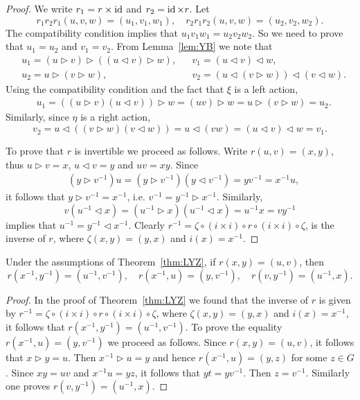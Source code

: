 \begin{proof}
We write $r_1=r\times\operatorname{id}$ and $r_2=\operatorname{id}\times r$. Let
\[
r_1r_2r_1(u,v,w)=(u_1,v_1,w_1),\quad
r_2r_1r_2(u,v,w)=(u_2,v_2,w_2).
\]
The compatibility condition implies that $u_1v_1w_1=u_2v_2w_2$. 
So we need to prove that $u_1=u_2$ and $v_1=v_2$. From Lemma~\ref{lem:YB}
we note that
\begin{align*}
&u_1=(u\rhd v)\rhd ( (u\lhd v)\rhd w),
&&v_1=(u\lhd v)\lhd w,\\
&u_2=u\rhd (v\rhd w),
&&v_2=(u\lhd (v\rhd w))\lhd (v\lhd w).
\end{align*}
Using the compatibility condition and the fact that $\xi$ is a left action, 
\begin{align*}
    &u_1=((u\rhd v)(u\lhd v))\rhd w=(uv)\rhd w=u\rhd (v\rhd w)=u_2.
\end{align*}
Similarly, since $\eta$ is a right action, 
\[
v_2=u\lhd ((v\rhd w)(v\lhd w))=u\lhd (vw)=(u\lhd v)\lhd w=v_1.
\]

To prove that $r$ is invertible we proceed as follows. Write $r(u,v)=(x,y)$, thus $u\rhd v=x$, $u\lhd v=y$ and $uv=xy$. Since 
\begin{align*}
& (y\rhd v^{-1})u=(y\rhd v^{-1})(y\lhd v^{-1})=yv^{-1}=x^{-1}u,
\end{align*}
it follows that $y\rhd v^{-1}=x^{-1}$, i.e. $v^{-1}=y^{-1}\rhd x^{-1}$. Similarly, 
\[
v(u^{-1}\lhd x)=(u^{-1}\rhd x)(u^{-1}\lhd x)=u^{-1}x=vy^{-1}
\]
implies that $u^{-1}=y^{-1}\lhd x^{-1}$. Clearly 
$r^{-1}=\zeta\circ (i\times i)\circ r\circ (i\times i)\circ \zeta$,
is the inverse of $r$, where $\zeta(x,y)=(y,x)$ and $i(x)=x^{-1}$. 
\end{proof}

\begin{proposition}
Under the assumptions of Theorem~\ref{thm:LYZ}, 
if $r(x,y)=(u,v)$, then 
\[
r(x^{-1},y^{-1})=(u^{-1},v^{-1}),
\quad
r(x^{-1},u)=(y,v^{-1}),
\quad
r(v,y^{-1})=(u^{-1},x).
\]
\end{proposition}

\begin{proof}
In the proof of Theorem~\ref{thm:LYZ} we found that 
the inverse of $r$ is given by $r^{-1}=\zeta\circ (i\times i)\circ r\circ (i\times i)\circ \zeta$,
where $\zeta(x,y)=(y,x)$ and $i(x)=x^{-1}$, it follows that $r(x^{-1},y^{-1})=(u^{-1},v^{-1})$.  
To prove the equality $r(x^{-1},u)=(y,v^{-1})$ we proceed as follows. Since $r(x,y)=(u,v)$, it 
follows that $x\triangleright y=u$. Then $x^{-1}\triangleright u=y$ and
hence $r(x^{-1},u)=(y,z)$ for some $z\in G$. 
Since $xy=uv$ and $x^{-1}u=yz$, it follows that $yt=yv^{-1}$. Then 
$z=v^{-1}$. Similarly one proves $r(v,y^{-1})=(u^{-1},x).$
\end{proof}


